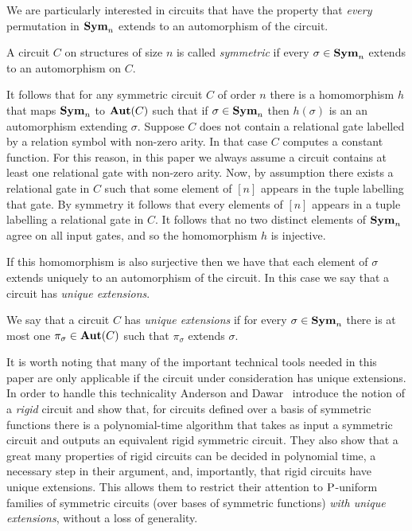 \documentclass[../main/thesis.tex]{subfiles}
\begin{document}
We are particularly interested in circuits that have the property that
\emph{every} permutation in $\text{\textbf{Sym}}_n$ extends to an automorphism of the circuit.

\begin{definition}[Symmetry]
  A circuit $C$ on structures of size $n$ is called \emph{symmetric} if every
  $\sigma \in \text{\textbf{Sym}}_n$ extends to an automorphism on $C$.
\end{definition}

It follows that for any symmetric circuit $C$ of order $n$ there is a
homomorphism $h$ that maps $\text{\textbf{Sym}}_n$ to $\text{\textbf{Aut}}(C)$ such that if $\sigma \in
\text{\textbf{Sym}}_n$ then $h(\sigma)$ is an an automorphism extending $\sigma$. Suppose $C$
does not contain a relational gate labelled by a relation symbol with non-zero
arity. In that case $C$ computes a constant function. For this reason, in this
paper we always assume a circuit contains at least one relational gate with
non-zero arity. Now, by assumption there exists a relational gate in $C$ such
that some element of $[n]$ appears in the tuple labelling that gate. By symmetry
it follows that every elements of $[n]$ appears in a tuple labelling a
relational gate in $C$. It follows that no two distinct elements of $\text{\textbf{Sym}}_n$
agree on all input gates, and so the homomorphism $h$ is injective.

If this homomorphism is also surjective then we have that each element of
$\sigma$ extends uniquely to an automorphism of the circuit. In this case we say
that a circuit has \emph{unique extensions}.

\begin{definition}
  We say that a circuit $C$ has \emph{unique extensions} if for every $\sigma
  \in \text{\textbf{Sym}}_n$ there is at most one $\pi_{\sigma} \in \text{\textbf{Aut}}(C)$ such that
  $\pi_{\sigma}$ extends $\sigma$.
\end{definition}

It is worth noting that many of the important technical tools needed in this
paper are only applicable if the circuit under consideration has unique
extensions. In order to handle this technicality Anderson and
Dawar~\cite{AndersonD17} introduce the notion of a \emph{rigid} circuit and show
that, for circuits defined over a basis of symmetric functions there is a
polynomial-time algorithm that takes as input a symmetric circuit and outputs an
equivalent rigid symmetric circuit. They also show that a great many properties
of rigid circuits can be decided in polynomial time, a necessary step in their
argument, and, importantly, that rigid circuits have unique extensions. This
allows them to restrict their attention to $\mathrm{P}$-uniform families of symmetric
circuits (over bases of symmetric functions) \emph{with unique extensions},
without a loss of generality.
\end{document}
